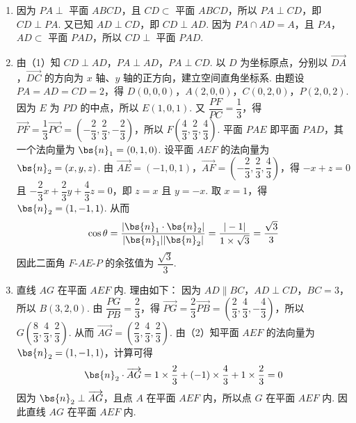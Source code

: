 \begin{solution}
\begin{enumerate}
\item 因为 \(PA\perp\) 平面 \(ABCD\)，且 \(CD\subset\) 平面 \(ABCD\)，所以 \(PA\perp CD\)，即 \(CD\perp PA\).
又已知 \(AD\perp CD\)，即 \(CD\perp AD\).
因为 \(PA\cap AD=A\)，且 \(PA\)，\(AD\subset\) 平面 \(PAD\)，所以 \(CD\perp\) 平面 \(PAD\).

\item 由（1）知 \(CD\perp AD\)，\(PA\perp AD\)，\(PA\perp CD\).
以 \(D\) 为坐标原点，分别以 \(\overrightarrow{DA}\)，\(\overrightarrow{DC}\) 的方向为 \(x\) 轴、\(y\) 轴的正方向，建立空间直角坐标系.
由题设 \(PA=AD=CD=2\)，得 \(D(0,0,0)\)，\(A(2,0,0)\)，\(C(0,2,0)\)，\(P(2,0,2)\).
因为 \(E\) 为 \(PD\) 的中点，所以 \(E(1,0,1)\).
又 \(\dfrac{PF}{PC}=\dfrac13\)，得 \(\overrightarrow{PF}=\dfrac13\overrightarrow{PC}=\left(-\dfrac23,\dfrac23,-\dfrac23\right)\)，所以 \(F\left(\dfrac43,\dfrac23,\dfrac43\right)\).
平面 \(PAE\) 即平面 \(PAD\)，其一个法向量为 \(\bs{n}_1=(0,1,0)\).
设平面 \(AEF\) 的法向量为 \(\bs{n}_2=(x,y,z)\).
由 \(\overrightarrow{AE}=(-1,0,1)\)，\(\overrightarrow{AF}=\left(-\dfrac23,\dfrac23,\dfrac43\right)\)，得
\(-x+z=0\) 且 \(-\dfrac23x+\dfrac23y+\dfrac43z=0\)，即 \(z=x\) 且 \(y=-x\).
取 \(x=1\)，得 \(\bs{n}_2=(1,-1,1)\). 从而
\[
\cos\theta=\frac{|\bs{n}_1\cdot\bs{n}_2|}{|\bs{n}_1||\bs{n}_2|}=\frac{|-1|}{1\times\sqrt3}=\frac{\sqrt3}{3}
\]
因此二面角 \(F\)-\(AE\)-\(P\) 的余弦值为 \(\dfrac{\sqrt3}{3}\).

\item 直线 \(AG\) 在平面 \(AEF\) 内. 理由如下：
因为 \(AD\parallel BC\)，\(AD\perp CD\)，\(BC=3\)，所以 \(B(3,2,0)\).
由 \(\dfrac{PG}{PB}=\dfrac23\)，得 \(\overrightarrow{PG}=\dfrac23\overrightarrow{PB}=\left(\dfrac23,\dfrac43,-\dfrac43\right)\)，所以 \(G\left(\dfrac83,\dfrac43,\dfrac23\right)\).
从而 \(\overrightarrow{AG}=\left(\dfrac23,\dfrac43,\dfrac23\right)\).
由（2）知平面 \(AEF\) 的法向量为 \(\bs{n}_2=(1,-1,1)\)，计算可得
\[
\bs{n}_2\cdot\overrightarrow{AG}=1\times\frac23+(-1)\times\frac43+1\times\frac23=0
\]
因为 \(\bs{n}_2\perp\overrightarrow{AG}\)，且点 \(A\) 在平面 \(AEF\) 内，所以点 \(G\) 在平面 \(AEF\) 内.
因此直线 \(AG\) 在平面 \(AEF\) 内.
\end{enumerate}
\end{solution}

